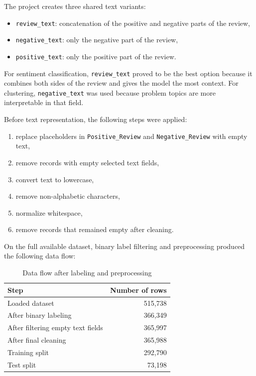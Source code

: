 \documentclass[twoside, 12pt]{article}
\begin{document}


The project creates three shared text variants:

\begin{itemize}
    \item \texttt{review\_text}: concatenation of the positive and negative parts of the review,
    \item \texttt{negative\_text}: only the negative part of the review,
    \item \texttt{positive\_text}: only the positive part of the review.
\end{itemize}

For sentiment classification, \texttt{review\_text} proved to be the best option because it combines both sides of the review and gives the model the most context. For clustering, \texttt{negative\_text} was used because problem topics are more interpretable in that field.


Before text representation, the following steps were applied:

\begin{enumerate}
    \item replace placeholders in \texttt{Positive\_Review} and \texttt{Negative\_Review} with empty text,
    \item remove records with empty selected text fields,
    \item convert text to lowercase,
    \item remove non-alphabetic characters,
    \item normalize whitespace,
    \item remove records that remained empty after cleaning.
\end{enumerate}

On the full available dataset, binary label filtering and preprocessing produced the following data flow:

\begin{table}[H]
\centering
\caption{Data flow after labeling and preprocessing}
\begin{tabular}{|p{7cm}|r|}
\hline
\textbf{Step} & \textbf{Number of rows} \\ \hline
Loaded dataset & 515,738 \\ \hline
After binary labeling & 366,349 \\ \hline
After filtering empty text fields & 365,997 \\ \hline
After final cleaning & 365,988 \\ \hline
Training split & 292,790 \\ \hline
Test split & 73,198 \\ \hline
\end{tabular}
\end{table}
\end{document}
